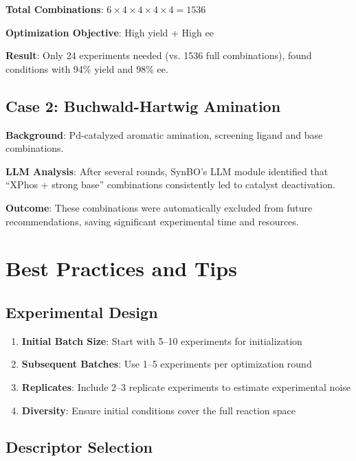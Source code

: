 \documentclass[12pt,a4paper]{article}
\begin{document}
\textbf{Total Combinations}: $6 \times 4 \times 4 \times 4 \times 4 = 1536$

\textbf{Optimization Objective}: High yield + High ee

\textbf{Result}: Only 24 experiments needed (vs. 1536 full combinations), found conditions with 94\% yield and 98\% ee.

\subsection{Case 2: Buchwald-Hartwig Amination}

\textbf{Background}: Pd-catalyzed aromatic amination, screening ligand and base combinations.

\textbf{LLM Analysis}: After several rounds, SynBO's LLM module identified that ``XPhos + strong base'' combinations consistently led to catalyst deactivation.

\textbf{Outcome}: These combinations were automatically excluded from future recommendations, saving significant experimental time and resources.

\section{Best Practices and Tips}
\label{sec:best_practices}

\subsection{Experimental Design}

\begin{enumerate}
    \item \textbf{Initial Batch Size}: Start with 5--10 experiments for initialization
    \item \textbf{Subsequent Batches}: Use 1--5 experiments per optimization round
    \item \textbf{Replicates}: Include 2--3 replicate experiments to estimate experimental noise
    \item \textbf{Diversity}: Ensure initial conditions cover the full reaction space
\end{enumerate}

\subsection{Descriptor Selection}
\end{document}

